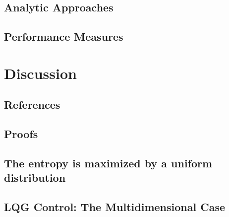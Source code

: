 \documentclass[justified]{tufte-book}
\begin{document}
\section{Analytic Approaches}

\section{Performance Measures}

\chapter{Discussion}

\section{References}
{}


\begin{appendices}

\chapter{Proofs}
\section{The entropy is maximized by a uniform distribution}
\label{app:entropy}

\section{LQG Control: The Multidimensional Case}
\label{app:lqg}

\end{appendices}
\end{document}
